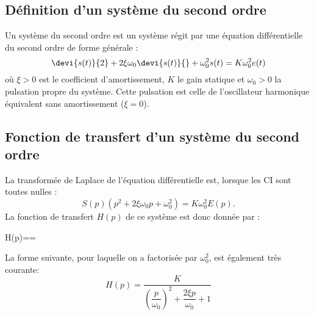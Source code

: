 \subsection{Définition d'un système du second ordre}
Un système du second ordre est un système régit par une équation 
différentielle du second ordre de forme générale :
\[
\devi{s(t)}{2}+2\xi\omega_0\devi{s(t)}{}+\omega^2_0s(t)=K\omega^2_0e(t)
\]
où $\xi>0$ est le coefficient d'amortissement, $K$ le gain statique et 
$\omega_0>0$ la pulsation propre du système. Cette pulsation est celle de 
l'oscillateur harmonique équivalent sans amortissement ($\xi=0$).
\subsection{Fonction de transfert d'un système du second ordre}
La transformée de Laplace de l'équation différentielle est, lorsque les CI 
sont toutes nulles :
\[
S(p)\left(p^2+2\xi\omega_0p+\omega^2_0\right)=K\omega^2_0E(p).
\]
La fonction de transfert $H(p)$ de ce système est donc donnée par :
\begin{bequation}
    H(p)==
    \label{eq-2nd_ft}
\end{bequation}
La forme suivante, pour laquelle on a factorisée par $\omega^2_0$, est 
également très courante:
\[
H(p)=\dfrac{K}{\left(\dfrac{p}{\omega_0}\right)^2
    +\dfrac{2\xi p}{\omega_0}+1}
\]
